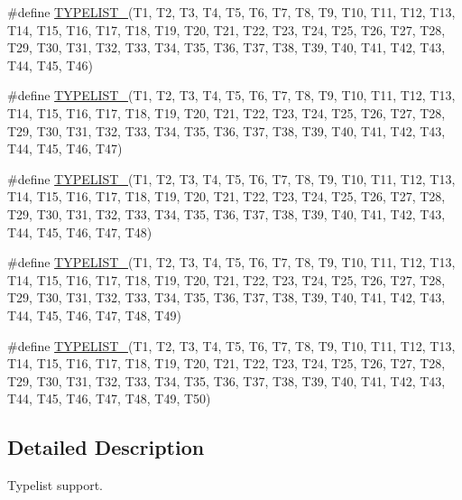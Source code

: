 \begin{DoxyCompactItemize}
\item 
\#define \mbox{\hyperlink{adat-devel_2lib_2adat_2typelist_8h_a381f94db416ceb080f56ba9cfa96358b}{T\+Y\+P\+E\+L\+I\+S\+T\+\_}}(T1,  T2,  T3,  T4,  T5,  T6,  T7,  T8,  T9,  T10,  T11,  T12,  T13,  T14,  T15,  T16,  T17,  T18,  T19,  T20,  T21,  T22,  T23,  T24,  T25,  T26,  T27,  T28,  T29,  T30,  T31,  T32,  T33,  T34,  T35,  T36,  T37,  T38,  T39,  T40,  T41,  T42,  T43,  T44,  T45,  T46)
\item 
\#define \mbox{\hyperlink{adat-devel_2lib_2adat_2typelist_8h_a7cb4dd3f2008fee9098880237e897317}{T\+Y\+P\+E\+L\+I\+S\+T\+\_}}(T1,  T2,  T3,  T4,  T5,  T6,  T7,  T8,  T9,  T10,  T11,  T12,  T13,  T14,  T15,  T16,  T17,  T18,  T19,  T20,  T21,  T22,  T23,  T24,  T25,  T26,  T27,  T28,  T29,  T30,  T31,  T32,  T33,  T34,  T35,  T36,  T37,  T38,  T39,  T40,  T41,  T42,  T43,  T44,  T45,  T46,  T47)
\item 
\#define \mbox{\hyperlink{adat-devel_2lib_2adat_2typelist_8h_a2b1a90b7b3e8e5c80dd12ab0e4878c52}{T\+Y\+P\+E\+L\+I\+S\+T\+\_}}(T1,  T2,  T3,  T4,  T5,  T6,  T7,  T8,  T9,  T10,  T11,  T12,  T13,  T14,  T15,  T16,  T17,  T18,  T19,  T20,  T21,  T22,  T23,  T24,  T25,  T26,  T27,  T28,  T29,  T30,  T31,  T32,  T33,  T34,  T35,  T36,  T37,  T38,  T39,  T40,  T41,  T42,  T43,  T44,  T45,  T46,  T47,  T48)
\item 
\#define \mbox{\hyperlink{adat-devel_2lib_2adat_2typelist_8h_a47141e5b7fbf647d2eb94215f3544fd8}{T\+Y\+P\+E\+L\+I\+S\+T\+\_}}(T1,  T2,  T3,  T4,  T5,  T6,  T7,  T8,  T9,  T10,  T11,  T12,  T13,  T14,  T15,  T16,  T17,  T18,  T19,  T20,  T21,  T22,  T23,  T24,  T25,  T26,  T27,  T28,  T29,  T30,  T31,  T32,  T33,  T34,  T35,  T36,  T37,  T38,  T39,  T40,  T41,  T42,  T43,  T44,  T45,  T46,  T47,  T48,  T49)
\item 
\#define \mbox{\hyperlink{adat-devel_2lib_2adat_2typelist_8h_aae95d691ec14bcd7cb2ce84f22f149b1}{T\+Y\+P\+E\+L\+I\+S\+T\+\_}}(T1,  T2,  T3,  T4,  T5,  T6,  T7,  T8,  T9,  T10,  T11,  T12,  T13,  T14,  T15,  T16,  T17,  T18,  T19,  T20,  T21,  T22,  T23,  T24,  T25,  T26,  T27,  T28,  T29,  T30,  T31,  T32,  T33,  T34,  T35,  T36,  T37,  T38,  T39,  T40,  T41,  T42,  T43,  T44,  T45,  T46,  T47,  T48,  T49,  T50)
\end{DoxyCompactItemize}


\subsection{Detailed Description}
Typelist support. 



